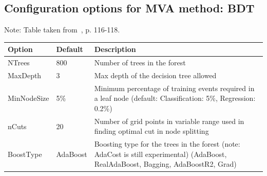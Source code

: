 \documentclass[11pt]{scrartcl}
\begin{document}
	\subsection{Configuration options for MVA method: BDT}
	
	Note: Table taken from~\cite{TMVA}, p. 116-118.
	
	\label{sec:annex-BDTdef}
	
\begin{longtable}[c]{|p{4cm}|p{2.5cm}|p{7cm}|}
\hline
Option               & Default                & Description                                                                                                                                                                                                                                                                                             \\ \hline
NTrees               & 800                    & Number of trees in the forest                                                                                                                                                                                                                                                                           \\ \hline
MaxDepth             & 3                      & Max depth of the decision tree allowed                                                                                                                                                                                                                                                                  \\ \hline
MinNodeSize          & 5\%                    & Minimum percentage of training events required in a leaf node (default: Classification: 5\%, Regression: 0.2\%)                                                                                                                                                                                         \\ \hline
nCuts                & 20                     & Number of grid points in variable range used in finding optimal cut in node splitting                                                                                                                                                                                                                   \\ \hline
BoostType            & AdaBoost               & Boosting type for the trees in the forest (note: AdaCost is still experimental) (AdaBoost, RealAdaBoost, Bagging, AdaBoostR2, Grad)                                                                                                                                                                     \\ \hline

\end{longtable}
\end{document}
